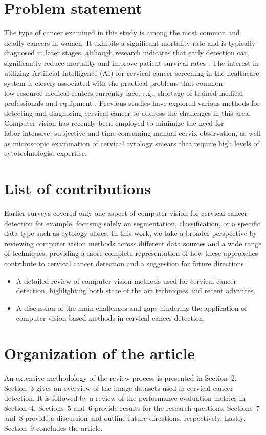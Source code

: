 \documentclass{svjour3}
\begin{document}
\section{Problem statement}
The type of cancer examined in this study is among the most common and deadly cancers in women. It exhibits a significant mortality rate and is typically diagnosed in later stages, although research indicates that early detection can significantly reduce mortality and improve patient survival rates \cite{ref14}. The interest in utilizing Artificial Intelligence (AI) for cervical cancer screening in the healthcare system is closely associated with the practical problems that common low‑resource medical centers currently face, e.g., shortage of trained medical professionals and equipment \cite{ref15}. Previous studies have explored various methods for detecting and diagnosing cervical cancer to address the challenges in this area. Computer vision has recently been employed to minimize the need for labor‑intensive, subjective and time‑consuming manual cervix observation, as well as microscopic examination of cervical cytology smears that require high levels of cytotechnologist expertise.
\section{List of contributions}
Earlier surveys covered only one aspect of computer vision for cervical cancer detection for example, focusing solely on segmentation, classification, or a specific data type such as cytology slides. In this work, we take a broader perspective by reviewing computer vision methods across different data sources and a wide range of techniques, providing a more complete representation of how these approaches contribute to cervical cancer detection and a suggestion for future directions.
\begin{itemize}
\item A detailed review of computer vision methods used for cervical cancer detection, highlighting both state of the art techniques and recent advances.
\item A discussion of the main challenges and gaps hindering the application of computer vision‑based methods in cervical cancer detection.
\end{itemize}
\section{Organization of the article}
An extensive methodology of the review process is presented in Section~2. Section~3 gives an overview of the image datasets used in cervical cancer detection. It is followed by a review of the performance evaluation metrics in Section~4. Sections~5 and~6 provide results for the research questions. Sections~7 and~8 provide a discussion and outline future directions, respectively. Lastly, Section~9 concludes the article.
\end{document}
